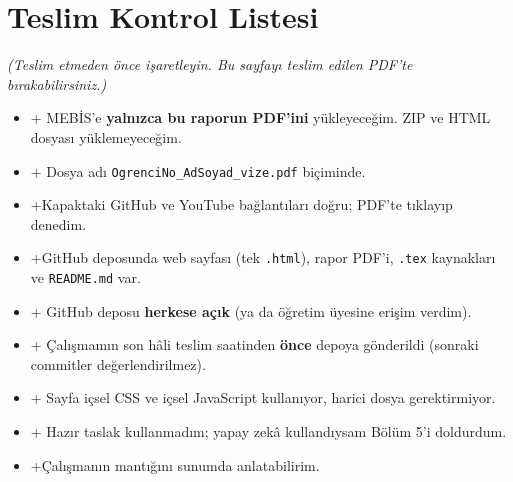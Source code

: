 \documentclass[12pt,a4paper]{article}
\newcommand{\aciklama}[1]{{\color{gray}\itshape (#1)}}
\begin{document}
\section{Teslim Kontrol Listesi}
\aciklama{Teslim etmeden önce işaretleyin. Bu sayfayı teslim edilen PDF'te bırakabilirsiniz.}
\begin{itemize}[label={}]
  \item + MEBİS'e \textbf{yalnızca bu raporun PDF'ini} yükleyeceğim. ZIP ve HTML dosyası yüklemeyeceğim.
  \item  + Dosya adı \texttt{OgrenciNo\_AdSoyad\_vize.pdf} biçiminde.
  \item  +Kapaktaki GitHub ve YouTube bağlantıları doğru; PDF'te tıklayıp denedim.
  \item  +GitHub deposunda web sayfası (tek \texttt{.html}), rapor PDF'i, \texttt{.tex} kaynakları ve \texttt{README.md} var.
  \item  + GitHub deposu \textbf{herkese açık} (ya da öğretim üyesine erişim verdim).
  \item  + Çalışmamın son hâli teslim saatinden \textbf{önce} depoya gönderildi (sonraki commitler değerlendirilmez).
  \item  + Sayfa içsel CSS ve içsel JavaScript kullanıyor, harici dosya gerektirmiyor.
  \item  + Hazır taslak kullanmadım; yapay zekâ kullandıysam Bölüm 5'i doldurdum.
  \item  +Çalışmanın mantığını sunumda anlatabilirim.
\end{itemize}
\end{document}
